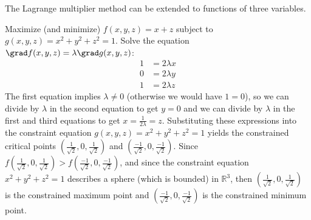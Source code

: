 The Lagrange multiplier method can be extended to functions of three variables.

\begin{example}\label{ex_lagr_3var}
Maximize (and minimize) $f(x,y,z) = x+z$ subject to $g(x,y,z) = x^2 + y^2 + z^2 = 1$.
\solution
Solve the equation $\grad f(x,y,z) = \lambda \grad g(x,y,z)$:
 \begin{align*}
  1 &= 2\lambda x\\
  0 &= 2\lambda y\\
  1 &= 2\lambda z
 \end{align*}
 The first equation implies $\lambda \ne 0$ (otherwise we would have $1=0$), so we can divide by $\lambda$ in the second equation to get $y=0$ and we can divide by $\lambda$ in the first and third equations to get $x=\frac1{2\lambda}=z$. Substituting these expressions into the constraint equation $g(x,y,z) = x^2 + y^2 + z^2 = 1$ yields the constrained critical points $\left( \frac1{\sqrt2},0,\frac1{\sqrt2} \right)$ and $\left( \frac{-1}{\sqrt2},0,\frac{-1}{\sqrt2}\right)$. Since $f\left( \frac1{\sqrt2},0,\frac1{\sqrt2}\right)>f\left(\frac{-1}{\sqrt2},0,\frac{-1}{\sqrt2}\right)$, and since the constraint equation $x^2 + y^2 + z^2 = 1$ describes a sphere (which is bounded) in $\mathbb{R}^3$, then $\left(\frac1{\sqrt2},0,\frac1{\sqrt2}\right)$ is the constrained maximum point and $\left(\frac{-1}{\sqrt2},0,\frac{-1}{\sqrt2}\right)$ is the constrained minimum point.
\end{example}

%

